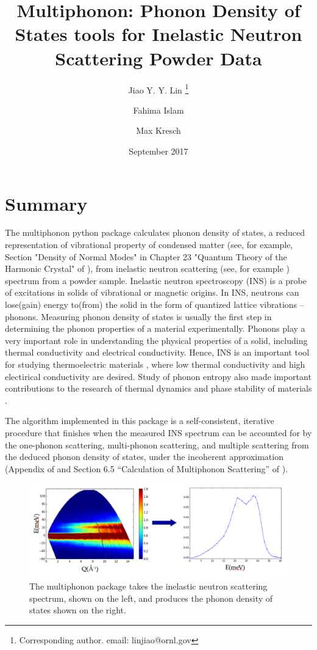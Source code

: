 \documentclass{article}
\title{Multiphonon: Phonon Density of States tools for Inelastic Neutron Scattering Powder Data}
\author[1]{Jiao Y. Y. Lin \thanks{Corresponding author. email: linjiao@ornl.gov}}
\author[1]{Fahima Islam}
\author[2]{Max Kresch}
\affil[1]{Neutron Scattering Division, Oak Ridge National Lab}
\affil[2]{mkresch@gmail.com}
\date{September 2017}
\begin{document}
\maketitle

\section{Summary}\label{summary}

The multiphonon python package calculates phonon density of states,
a reduced representation of vibrational property of condensed matter (see, for example,
Section "Density of Normal Modes" in
Chapter 23 "Quantum Theory of the Harmonic Crystal" of \cite{ashcroftmermin}),
from
inelastic neutron scattering (see, for example \cite{FultzINSbook})
spectrum from a powder sample.
Inelastic neutron spectroscopy (INS) is a probe of excitations in solids of
vibrational or magnetic origins.
In INS, neutrons can lose(gain) energy 
to(from) the solid in the form of quantized lattice vibrations -- phonons.
Measuring phonon density of states is usually the first step
in determining the phonon properties of a material experimentally.
Phonons play a very important role in understanding the physical properties of a solid,
including thermal conductivity and electrical conductivity.
Hence, INS is an important tool for studying thermoelectric materials \cite{budai2014, lichen2015},
where
low thermal conductivity and high electirical conductivity are desired.
Study of phonon entropy also made important contributions to
the research of thermal dynamics and phase stability of materials
\cite{FULTZ2010, bogdanoff2002phonon, swan2006vibrational}.

The algorithm implemented in this package is a self-consistent,
iterative procedure that finishes when
the measured INS spectrum can be accounted for by
the one-phonon scattering, multi-phonon scattering, and multiple
scattering from the deduced phonon density of states, under the
incoherent approximation (Appendix of \cite{KreschNickel2007} and
Section 6.5 ``Calculation of Multiphonon Scattering'' of
\cite{FultzINSbook}).

\begin{figure}
  \includegraphics[scale=0.25]{sqe2dos}
  \caption{The multiphonon package takes the inelastic neutron scattering spectrum, shown on the left, and produces the phonon density of states shown on the right.}
\end{figure}
\end{document}
